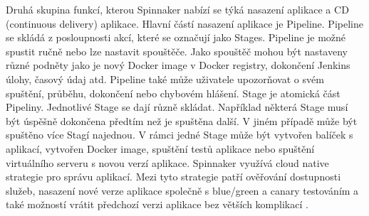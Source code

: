Druhá skupina funkcí, kterou Spinnaker nabízí se týká nasazení aplikace a CD (continuous delivery) aplikace. Hlavní částí nasazení aplikace je Pipeline. Pipeline se skládá z posloupnosti akcí, které se označují jako Stages. Pipeline je možné spustit ručně nebo lze nastavit spouštěče. Jako spouštěč mohou být nastaveny různé podněty jako je nový Docker image v Docker registry, dokončení Jenkins úlohy, časový údaj atd. Pipeline také může uživatele upozorňovat o svém spuštění, průběhu, dokončení nebo chybovém hlášení. Stage je atomická část Pipeliny. Jednotlivé Stage se dají různě skládat. Například některá Stage musí být úspěšně dokončena předtím než je spuštěna další. V jiném případě může být spuštěno více Stagí najednou. V rámci jedné Stage může být vytvořen balíček s aplikací, vytvořen Docker image, spuštění testů aplikace nebo  spuštění virtuálního serveru s novou verzí aplikace. Spinnaker využívá cloud native strategie pro správu aplikací. Mezi tyto strategie patří ověřování dostupnosti služeb, nasazení nové verze aplikace společně s blue/green a canary testováním a také možností vrátit předchozí verzi aplikace bez větších komplikací \cite{spinnaker}.

